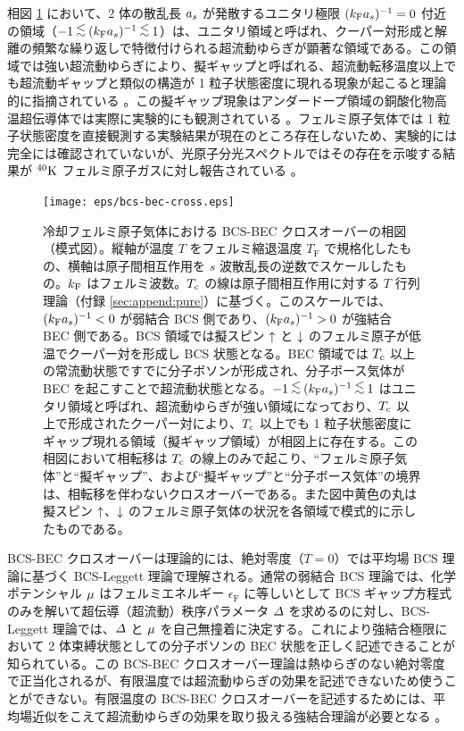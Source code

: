 相図 \ref{fig:bcsbecsouzu} において、2 体の散乱長 $a_s$ が発散するユニタリ極限 $(k_{\text{F}} a_s)^{-1}=0$ 付近の領域（$-1\ltsim \askfi \ltsim 1$）は、ユニタリ領域と呼ばれ、クーパー対形成と解離の頻繁な繰り返しで特徴付けられる超流動ゆらぎが顕著な領域である。この領域では強い超流動ゆらぎにより、擬ギャップと呼ばれる、超流動転移温度以上でも超流動ギャップと類似の構造が 1 粒子状態密度に現れる現象が起こると理論的に指摘されている \cite{gaebler2010,sagi2015}。この擬ギャップ現象はアンダードープ領域の銅酸化物高温超伝導体では実際に実験的にも観測されている \cite{kugler2001}。フェルミ原子気体では 1 粒子状態密度を直接観測する実験結果が現在のところ存在しないため、実験的には完全には確認されていないが、光原子分光スペクトルではその存在を示唆する結果が ${}^{40}\mathrm{K}$ フェルミ原子ガスに対し報告されている \cite{stewart2008}。

\begin{figure}[t]
\centering
\texttt{[image: eps/bcs-bec-cross.eps]}
\caption{冷却フェルミ原子気体における BCS-BEC クロスオーバーの相図（模式図）。縦軸が温度 $T$ をフェルミ縮退温度 $T_{\text{F}}$ で規格化したもの、横軸は原子間相互作用を $s$ 波散乱長の逆数でスケールしたもの。$k_{\text{F}}$ はフェルミ波数。$T_{\text{c}}$ の線は原子間相互作用に対する $T$ 行列理論（付録 \ref{sec:append:pure}）に基づく。このスケールでは、$(k_{\text{F}} a_s)^{-1}<0$ が弱結合 BCS 側であり、$(k_{\text{F}} a_s)^{-1}>0$ が強結合 BEC 側である。BCS 領域では擬スピン $\uparrow$ と $\downarrow$ のフェルミ原子が低温でクーパー対を形成し BCS 状態となる。BEC 領域では $T_{\text{c}}$ 以上の常流動状態ですでに分子ボソンが形成され、分子ボース気体が BEC を起こすことで超流動状態となる。$-1\ltsim \askfi \ltsim 1$ はユニタリ領域と呼ばれ、超流動ゆらぎが強い領域になっており、$T_{\text{c}}$ 以上で形成されたクーパー対により、$T_{\text{c}}$ 以上でも 1 粒子状態密度にギャップ現れる領域（擬ギャップ領域）が相図上に存在する。この相図において相転移は $T_{\text{c}}$ の線上のみで起こり、“フェルミ原子気体”と“擬ギャップ”、および“擬ギャップ”と“分子ボース気体”の境界は、相転移を伴わないクロスオーバーである。また図中黄色の丸は擬スピン $\uparrow$、$\downarrow$ のフェルミ原子気体の状況を各領域で模式的に示したものである。}
\label{fig:bcsbecsouzu}
\end{figure}


BCS-BEC クロスオーバーは理論的には、絶対零度（$T=0$）では平均場 BCS 理論に基づく BCS-Leggett 理論で理解される。通常の弱結合 BCS 理論では、化学ポテンシャル $\mu$ はフェルミエネルギー $\epsilon_{\text{F}}$ に等しいとして BCS ギャップ方程式のみを解いて超伝導（超流動）秩序パラメータ $\varDelta$ を求めるのに対し、BCS-Leggett 理論では、$\varDelta$ と $\mu$ を自己無撞着に決定する。これにより強結合極限において 2 体束縛状態としての分子ボソンの BEC 状態を正しく記述できることが知られている。この BCS-BEC クロスオーバー理論は熱ゆらぎのない絶対零度で正当化されるが、有限温度では超流動ゆらぎの効果を記述できないため使うことができない。有限温度の BCS-BEC クロスオーバーを記述するためには、平均場近似をこえて超流動ゆらぎの効果を取り扱える強結合理論が必要となる \cite{sademelo1993,Nozieres1985,perali2002}。


